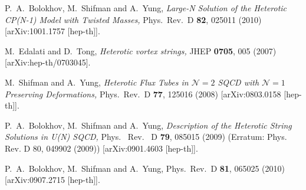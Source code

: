 \documentclass[epsfig,12pt]{article}
\begin{document}
\begin{thebibliography}{99}
  P.~A.~Bolokhov, M.~Shifman and A.~Yung,
  {\em Large-N Solution of the Heterotic CP(N-1) Model with Twisted Masses,}
  Phys.\ Rev.\ D {\bf 82}, 025011 (2010)
  [arXiv:1001.1757 [hep-th]].

   M.~Edalati and D.~Tong,
 {\em Heterotic vortex strings,}
  JHEP {\bf 0705}, 005 (2007)
  [arXiv:hep-th/0703045].
  
  M.~Shifman and A.~Yung,
  {\em Heterotic Flux Tubes in ${\mathcal N}=2$ SQCD with ${\mathcal N}=1$ Preserving Deformations,}
  Phys.\ Rev.\  D {\bf 77}, 125016 (2008)
  [arXiv:0803.0158 [hep-th]].

  P.~A.~Bolokhov, M.~Shifman and A.~Yung,
  {\em Description of the Heterotic String Solutions in U(N) SQCD,}
  Phys. \ Rev. \ D {\bf 79}, 085015 (2009) (Erratum: Phys. Rev. D 80, 049902 (2009))
  [arXiv:0901.4603 [hep-th]].

  P.~A.~Bolokhov, M.~Shifman and A.~Yung,
  Phys.\ Rev.\  D {\bf 81}, 065025 (2010)
  [arXiv:0907.2715 [hep-th]].


\end{thebibliography}
\end{document}
